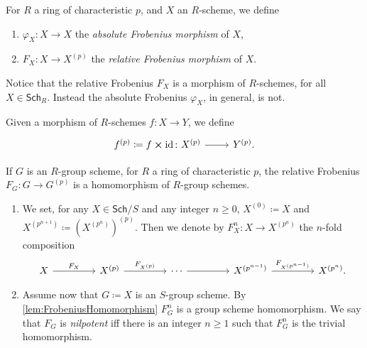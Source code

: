 \begin{defn}
	For $R$ a ring of characteristic $p$, and $X$ an $R$-scheme, we define
\begin{enumerate}
	\item $\varphi_X\colon X \to X$ the {\em absolute Frobenius morphism} of $X$,
	\item $F_X \colon X \to X^{(p)}$ the {\em relative Frobenius morphism} of $X$.
\end{enumerate}
\end{defn}


\begin{rem}[]
	Notice that the relative Frobenius $F_X$ is a
	morphism of $R$-schemes, for all $X \in \mathsf{Sch}_{ R }$.
	Instead the absolute Frobenius $\varphi_X$, in general, is not.
\end{rem}


\begin{ntt}
	Given a morphism of $R$-schemes $f\colon X \to Y$,
	we define 
	\begin{equation}
	\begin{tikzcd}[row sep = 0ex
		,/tikz/column 1/.append style={anchor=base east}
		,/tikz/column 2/.append style={anchor=base west}]
		f^{(p)} \coloneqq f \cross \mathrm{id}_{  }\colon X^{(p)} \arrow[r, "", rightarrow] &
		Y^{(p)}
	.\end{tikzcd}
	\end{equation} 
\end{ntt}


\begin{lem}\label{lem:FrobeniusHomomorphism}
	If $G$ is an $R$-group scheme, for $R$ a ring of characteristic $p$,
	the relative Frobenius $F_G\colon G \to G^{(p)}$ is a 
	homomorphism of $R$-group schemes.
\end{lem} 


\begin{defn}\leavevmode\vspace{-1.2\baselineskip}\label{defn:nilpotentFrobenius}
\begin{enumerate}
\item We set, for any $X \in \mathsf{Sch}/S$ and any integer $n \geq 0$,
	$X^{(0)} \coloneqq X$ and $X^{(p^{n+1})} \coloneqq \left( X^{(p^{n})} \right)^{(p)}$.
	Then we denote by $F^n_X\colon X \to X^{(p^n)}$
	the $n$-fold composition
	\begin{equation}
	\begin{tikzcd}[column sep=4.3em]
		X \arrow[r, "F_X", rightarrow] &
		X^{(p)} \arrow[r, "F_{X^{(p)}}", rightarrow] &
		\cdots \arrow[r, "", rightarrow] &
		X^{(p^{n-1})} \arrow[r, "F_{X^{(p^{n-1})}}", rightarrow] &
		X^{(p^n)}
	.\end{tikzcd}
	\end{equation}
\item Assume now that $G \coloneqq X$ is an $S$-group scheme. 
	By \cref{lem:FrobeniusHomomorphism} $F^n_G$ is a group scheme homomorphism.
	We say that $F_G$ is {\em nilpotent} iff there is an integer $n \geq 1$ such that
	$F^n_G$ is the trivial homomorphism.
\end{enumerate}
\end{defn}


